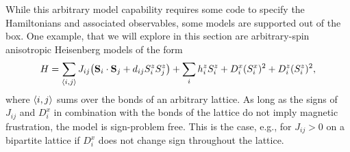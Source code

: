 \documentclass{SciPost}
\begin{document}
While this arbitrary model capability requires some code to specify the Hamiltonians and associated observables, some models are supported out of the box. One example, that we will explore in this section are arbitrary-spin anisotropic Heisenberg models of the form
\begin{equation}
\label{eq:heisenberg}
H = \sum_{\braket{i,j}} J_{ij} \qty(\vb S_i \cdot \vb S_j + d_{ij} S^z_i S^z_j) + \sum_i h_i^z S^z_i + D^x_i (S^x_i)^2 + D^z_i (S^z_i)^2,
\end{equation}
where $\braket{i,j}$ sums over the bonds of an arbitrary lattice. As long as the signs of $J_{ij}$ and $D^x_i$ in combination with the bonds of the lattice do not imply magnetic frustration, the model is sign-problem free. This is the case, e.g., for $J_{ij} > 0$ on a bipartite lattice if $D^x_i$ does not change sign throughout the lattice.
\end{document}
